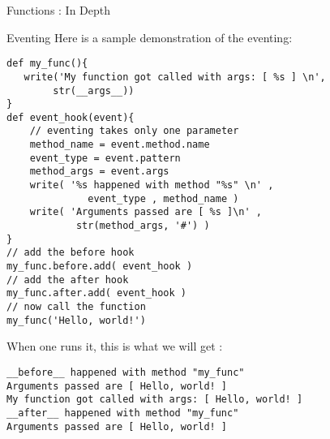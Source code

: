 \begin{section}{Functions : In Depth}
\begin{subsection}{Eventing}
Here is a sample demonstration of the eventing:
\begin{lstlisting}[style=JexlStyle]
def my_func(){
   write('My function got called with args: [ %s ] \n', 
        str(__args__))
}
def event_hook(event){  
    // eventing takes only one parameter  
    method_name = event.method.name 
    event_type = event.pattern
    method_args = event.args 
    write( '%s happened with method "%s" \n' , 
              event_type , method_name )
    write( 'Arguments passed are [ %s ]\n' , 
            str(method_args, '#') )
}
// add the before hook 
my_func.before.add( event_hook )
// add the after hook 
my_func.after.add( event_hook )
// now call the function 
my_func('Hello, world!')
\end{lstlisting}
When one runs it, this is what we will get :

\begin{lstlisting}[style=all]
__before__ happened with method "my_func" 
Arguments passed are [ Hello, world! ]
My function got called with args: [ Hello, world! ] 
__after__ happened with method "my_func" 
Arguments passed are [ Hello, world! ]
\end{lstlisting}

\end{subsection}


\end{section}

